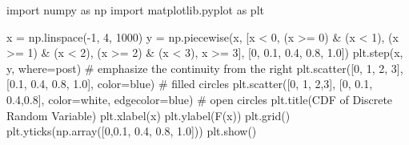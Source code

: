 \documentclass[
  letterpaper,
  DIV=11,
  numbers=noendperiod]{scrreport}
\newenvironment{Shaded}{\begin{snugshade}}{\end{snugshade}}
\newcommand{\CommentTok}[1]{\textcolor[rgb]{0.37,0.37,0.37}{#1}}
\newcommand{\DecValTok}[1]{\textcolor[rgb]{0.68,0.00,0.00}{#1}}
\newcommand{\FloatTok}[1]{\textcolor[rgb]{0.68,0.00,0.00}{#1}}
\newcommand{\ImportTok}[1]{\textcolor[rgb]{0.00,0.46,0.62}{#1}}
\newcommand{\NormalTok}[1]{\textcolor[rgb]{0.00,0.23,0.31}{#1}}
\newcommand{\OperatorTok}[1]{\textcolor[rgb]{0.37,0.37,0.37}{#1}}
\newcommand{\StringTok}[1]{\textcolor[rgb]{0.13,0.47,0.30}{#1}}
\theoremstyle{definition}
\theoremstyle{plain}
\theoremstyle{definition}
\theoremstyle{plain}
\theoremstyle{remark}
\begin{document}
\begin{Shaded}
\begin{Highlighting}[numbers=left,,]
\ImportTok{import}\NormalTok{ numpy }\ImportTok{as}\NormalTok{ np}
\ImportTok{import}\NormalTok{ matplotlib.pyplot }\ImportTok{as}\NormalTok{ plt}

\NormalTok{x }\OperatorTok{=}\NormalTok{ np.linspace(}\OperatorTok{{-}}\DecValTok{1}\NormalTok{, }\DecValTok{4}\NormalTok{, }\DecValTok{1000}\NormalTok{)}
\NormalTok{y }\OperatorTok{=}\NormalTok{ np.piecewise(x, [x }\OperatorTok{\textless{}} \DecValTok{0}\NormalTok{, (x }\OperatorTok{\textgreater{}=} \DecValTok{0}\NormalTok{) }\OperatorTok{\&}\NormalTok{ (x }\OperatorTok{\textless{}} \DecValTok{1}\NormalTok{), (x }\OperatorTok{\textgreater{}=} \DecValTok{1}\NormalTok{) }\OperatorTok{\&}\NormalTok{ (x }\OperatorTok{\textless{}} \DecValTok{2}\NormalTok{), (x }\OperatorTok{\textgreater{}=} \DecValTok{2}\NormalTok{) }\OperatorTok{\&}\NormalTok{ (x }\OperatorTok{\textless{}} \DecValTok{3}\NormalTok{), x }\OperatorTok{\textgreater{}=} \DecValTok{3}\NormalTok{], [}\DecValTok{0}\NormalTok{, }\FloatTok{0.1}\NormalTok{, }\FloatTok{0.4}\NormalTok{, }\FloatTok{0.8}\NormalTok{, }\FloatTok{1.0}\NormalTok{])}
\NormalTok{plt.step(x, y, where}\OperatorTok{=}\StringTok{\textquotesingle{}post\textquotesingle{}}\NormalTok{)}
\CommentTok{\# emphasize the continuity from the right}
\NormalTok{plt.scatter([}\DecValTok{0}\NormalTok{, }\DecValTok{1}\NormalTok{, }\DecValTok{2}\NormalTok{, }\DecValTok{3}\NormalTok{], [}\FloatTok{0.1}\NormalTok{, }\FloatTok{0.4}\NormalTok{, }\FloatTok{0.8}\NormalTok{, }\FloatTok{1.0}\NormalTok{], color}\OperatorTok{=}\StringTok{\textquotesingle{}blue\textquotesingle{}}\NormalTok{)  }\CommentTok{\# filled circles}
\NormalTok{plt.scatter([}\DecValTok{0}\NormalTok{, }\DecValTok{1}\NormalTok{, }\DecValTok{2}\NormalTok{,}\DecValTok{3}\NormalTok{], [}\DecValTok{0}\NormalTok{, }\FloatTok{0.1}\NormalTok{, }\FloatTok{0.4}\NormalTok{,}\FloatTok{0.8}\NormalTok{], color}\OperatorTok{=}\StringTok{\textquotesingle{}white\textquotesingle{}}\NormalTok{, edgecolor}\OperatorTok{=}\StringTok{\textquotesingle{}blue\textquotesingle{}}\NormalTok{)  }\CommentTok{\# open circles}
\NormalTok{plt.title(}\StringTok{\textquotesingle{}CDF of Discrete Random Variable\textquotesingle{}}\NormalTok{)}
\NormalTok{plt.xlabel(}\StringTok{\textquotesingle{}x\textquotesingle{}}\NormalTok{)}
\NormalTok{plt.ylabel(}\StringTok{\textquotesingle{}F(x)\textquotesingle{}}\NormalTok{)}
\NormalTok{plt.grid()}
\NormalTok{plt.yticks(np.array([}\DecValTok{0}\NormalTok{,}\FloatTok{0.1}\NormalTok{, }\FloatTok{0.4}\NormalTok{, }\FloatTok{0.8}\NormalTok{, }\FloatTok{1.0}\NormalTok{]))}
\NormalTok{plt.show()}
\end{Highlighting}
\end{Shaded}
\end{document}
